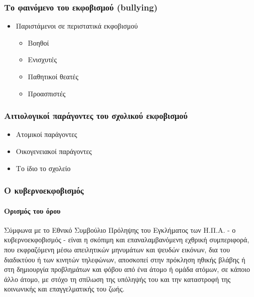\documentclass[hyperref={pdfpagelabels=false}, t]{beamer}
\let\olditem=\item%
\renewcommand{\item}{\olditem \justifying}%
\begin{document}
%
%

\begin{frame}[t]
\frametitle{Το φαινόμενο του εκφοβισμού (bullying)}
\vspace{-18.5pt}
\begin{adjustwidth}{-0.7cm}{}
\justifying
\begin{itemize}
\item Παριστάμενοι σε περιστατικά εκφοβισμού
\begin{itemize}
  \item Βοηθοί
  \item Ενισχυτές
  \item Παθητικοί θεατές
  \item Προασπιστές 
\end{itemize}
\end{itemize}
\end{adjustwidth}
\end{frame}

%
%

\begin{frame}[t]
\frametitle{Αιτιολογικοί παράγοντες του σχολικού εκφοβισμού}
\vspace{-18.5pt}
\begin{adjustwidth}{-0.7cm}{}
\justifying
\begin{itemize}
\item Ατομικοί παράγοντες \setlength{\itemsep}{15pt}
\item Οικογενειακοί παράγοντες \setlength{\itemsep}{15pt}
\item Tο ίδιο το σχολείο
\end{itemize}
\end{adjustwidth}
\end{frame}

%
%

\begin{frame}[t]
\frametitle{Ο κυβερνοεκφοβισμός}
\vspace{10pt}
\framesubtitle{Oρισμός του όρου}
\vspace{-18.5pt}
\begin{adjustwidth}{-0.7cm}{}
\justifying
\begin{list}{\quad}{}
\item Σύμφωνα με το Εθνικό Συμβούλιο Πρόληψης του Εγκλήματος των Η.Π.Α. - ο
κυβερνοεκφοβισμός - είναι η σκόπιμη και επαναλαμβανόμενη εχθρική συμπεριφορά,
που εκφραζόμενη μέσω απειλητικών μηνυμάτων και ψευδών εικόνων, δια του διαδικτύου ή των κινητών τηλεφώνων, αποσκοπεί στην πρόκληση ηθικής βλάβης ή στη δημιουργία προβλημάτων και φόβου από ένα άτομο ή ομάδα ατόμων, σε κάποιο άλλο άτομο, με
στόχο τη σπίλωση της υπόληψής του και την καταστροφή της κοινωνικής και επαγγελματικής
του ζωής.
\end{list}
\end{adjustwidth}
\end{frame}
\end{document}

